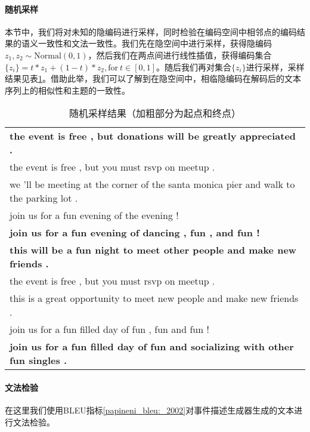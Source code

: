 \documentclass[]{template}
\begin{document}
\paragraph{随机采样}
本节中，我们将对未知的隐编码进行采样，同时检验在编码空间中相邻点的编码结果的语义一致性和文法一致性。我们先在隐空间中进行采样，获得隐编码$z_1,z_2 \sim \mathrm{Normal}(0,1)$，然后我们在两点间进行线性插值，获得编码集合$\{z_i\} = t*z_1+(1-t)*z_2 ,\mathrm{for}\ t \in [0,1]$。随后我们再对集合$\{z_i\}$进行采样，采样结果见表\ref{t3-3}。借助此举，我们可以了解到在隐空间中，相临隐编码在解码后的文本序列上的相似性和主题的一致性。 

\begin{table}[htbp]
    \center
    \caption{\label{t3-3}随机采样结果（加粗部分为起点和终点）}
    \begin{tabular*}{\linewidth}{p{\linewidth}}
\toprule
\textbf{the event is free , but donations will be greatly appreciated .}\\
the event is free , but you must rsvp on meetup . \\
we 'll be meeting at the corner of the santa monica pier and walk to the parking lot .\\
join us for a fun evening of the evening !\\
\textbf{join us for a fun evening of dancing , fun , and fun !}\\
\midrule
\textbf{this will be a fun night to meet other people and make new friends .}\\
the event is free , but you must rsvp on meetup . \\
this is a great opportunity to meet new people and make new friends .\\
join us for a fun filled day of fun , fun and fun ! \\
\textbf{join us for a fun filled day of fun and socializing with other fun singles . }\\
\bottomrule
    \end{tabular*}
\end{table}

\paragraph{文法检验}
在这里我们使用BLEU指标\ref{papineni_bleu:_2002}对事件描述生成器生成的文本进行文法检验。
\end{document}
